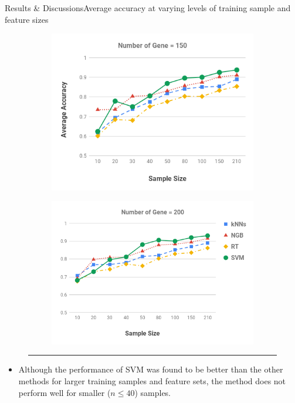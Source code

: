 \documentclass[xcolor=table]{beamer}
\numberwithin{figure}{section}
\numberwithin{equation}{section}
\begin{document}
\begin{frame}{Results \& Discussions}{Average accuracy at varying levels of training sample and feature sizes}
\begin{figure}
\begin{subfigure}
\end{subfigure}
\hspace{-.9in}\begin{subfigure}
  \centering
  \includegraphics[scale=0.18]{pictures/NumberofGene=150.png}
\end{subfigure}
\begin{subfigure}
  \centering
  \includegraphics[scale=0.18]{pictures/NumberofGene=200.png}
\end{subfigure}
  \textcolor{white}{\rule{2.4cm}{2cm}}
\end{figure}
\begin{itemize}
    \item \footnotesize{Although the performance of SVM was found to be better than the other methods for larger training samples and feature sets, the method does not perform well for smaller ($n \le 40$) samples.}
\end{itemize}
\end{frame}
\end{document}
